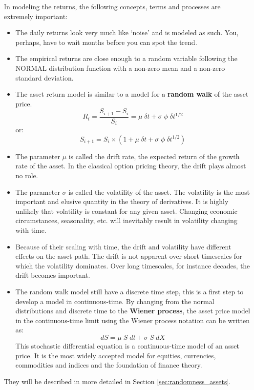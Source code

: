 In modeling the returns, the following concepts, terms and processes are extremely important:
\begin{itemize}
    \setlength\itemsep{0em}
    \item The daily returns look very much like `noise' and is modeled as such. You, perhaps, have to wait months before you can spot the trend.
    \item The empirical returns are close enough to a random variable following the NORMAL distribution function with a non-zero mean and a non-zero standard deviation.
    \item The asset return model is similar to a model for a \textbf{random walk} of the asset price.
    \begin{equation}
        R_i = \frac{S_{i+1} - S_i}{S_i} = \mu \; \delta t + \sigma \; \phi \; \delta t^{1/2}
    \end{equation}
    or:
    \begin{equation}
        S_{i+1} = S_i \times \left(1 + \mu \; \delta t + \sigma \; \phi \; \delta t^{1/2} \right)
    \end{equation}    
    \item The parameter $\mu$ is called the drift rate, the expected return of the growth rate of the asset. In the classical option pricing theory, the drift plays almost no role. 
    \item The parameter $\sigma$ is called the volatility of the asset. The volatility is the most important and elusive quantity in the theory of derivatives. It is highly unlikely that volatility is constant for any given asset. Changing economic circumstances, seasonality, etc. will inevitably result in volatility changing with time.
    \item Because of their scaling with time, the drift and volatility have different effects on the asset path. The drift is not apparent over short timescales for which the volatility dominates. Over long timescales, for instance decades, the drift becomes important.
    \item The random walk model still have a discrete time step, this is a first step to develop a model in continuous-time. By changing from the normal distributions and discrete time to the \textbf{Wiener process}, the asset price model in the continuous-time limit using the Wiener process notation can be written as:
    \begin{equation}
        dS = \mu \; S \; dt + \sigma \; S \; dX
    \end{equation}
    This stochastic differential equation is a continuous-time model of an asset price. It is the most widely accepted model for equities, currencies, commodities and indices and the foundation of finance theory.
\end{itemize}
They will be described in more detailed in Section \ref{sec:randomness_assets}.